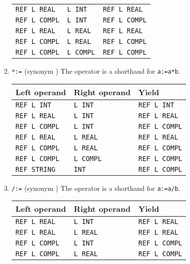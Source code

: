 \begin{enumerate}
\begin{tabular}{|l|l||l|}
  \texttt{REF L REAL}  &\texttt{L INT}     &\texttt{REF L REAL}\\
  \texttt{REF L COMPL} &\texttt{L INT}     &\texttt{REF L COMPL}\\
  \texttt{REF L REAL}  &\texttt{L REAL}    &\texttt{REF L REAL}\\
  \texttt{REF L COMPL} &\texttt{L REAL}    &\texttt{REF L COMPL}\\
  \texttt{REF L COMPL} &\texttt{L COMPL}   &\texttt{REF L COMPL}\\ \hline
\end{tabular} \newline
\item \verb|*:=| (synonym )\newline
The operator is a shorthand for \verb|a:=a*b|.\newline
\begin{tabular}{|l|l||l|}\hline
  Left operand    &Right operand &Yield\\ \hline
  \texttt{REF L INT}   &\texttt{L INT}     &\texttt{REF L INT}\\
  \texttt{REF L REAL}  &\texttt{L INT}     &\texttt{REF L REAL}\\
  \texttt{REF L COMPL} &\texttt{L INT}     &\texttt{REF L COMPL}\\
  \texttt{REF L REAL}  &\texttt{L REAL}    &\texttt{REF L REAL}\\
  \texttt{REF L COMPL} &\texttt{L REAL}    &\texttt{REF L COMPL}\\
  \texttt{REF L COMPL} &\texttt{L COMPL}   &\texttt{REF L COMPL}\\
  \texttt{REF STRING}  &\texttt{INT}       &\texttt{REF L COMPL}\\ \hline
\end{tabular} \newline
\item \verb|/:=| (synonym )\newline
The operator is a shorthand for \verb|a:=a/b|.\newline
\begin{tabular}{|l|l||l|}\hline
  Left operand    &Right operand &Yield\\ \hline
  \texttt{REF L REAL}  &\texttt{L INT}     &\texttt{REF L REAL}\\
  \texttt{REF L REAL}  &\texttt{L REAL}    &\texttt{REF L REAL}\\
  \texttt{REF L COMPL} &\texttt{L INT}     &\texttt{REF L COMPL}\\
  \texttt{REF L COMPL} &\texttt{L REAL}    &\texttt{REF L COMPL}\\

\end{tabular}
\end{enumerate}
